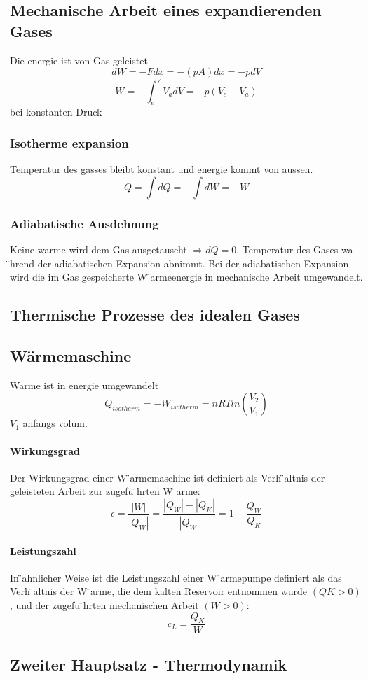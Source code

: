 \documentclass[7pt]{article}
\begin{document}
\begin{multicols*}{3}
\subsection{Mechanische Arbeit eines expandierenden Gases}
Die energie ist von Gas geleistet
\begin{equation}
	dW=-Fdx=-(pA)dx=-pdV
\end{equation}
\begin{equation}
	W=-\int^V_eV_adV=-p(V_e-V_a)
\end{equation}
bei konstanten Druck
\subsubsection{Isotherme expansion}
Temperatur des gasses bleibt konstant und energie kommt von aussen.
\begin{equation}
	Q=\int dQ=-\int dW=-W
\end{equation}
\subsubsection{Adiabatische Ausdehnung}
Keine warme wird dem Gas ausgetauscht $\Rightarrow dQ=0$, Temperatur des Gases wa ̈hrend der adiabatischen Expansion abnimmt. Bei der adiabatischen Expansion wird die im Gas gespeicherte W ̈armeenergie in mechanische Arbeit umgewandelt.

\subsection{Thermische Prozesse des idealen Gases}

\subsection{W{\"a}rmemaschine}
Warme ist in energie umgewandelt
\begin{equation}
	Q_{isotherm}=-W_{isotherm}=nRTln(\frac{V_2}{V_1})
\end{equation}
$V_1$ anfangs volum.
\paragraph{Wirkungsgrad}
Der Wirkungsgrad einer W ̈armemaschine ist definiert als Verh ̈altnis der geleisteten Arbeit zur zugefu ̈hrten W ̈arme:
\begin{equation}
	\epsilon=\frac{|W|}{|Q_W|}=\frac{|Q_W|-|Q_K|}{|Q_W|}=1-\frac{Q_W}{Q_K}
\end{equation}
\paragraph{Leistungszahl}
In  ̈ahnlicher Weise ist die Leistungszahl einer W ̈armepumpe definiert als das Verh ̈altnis der W ̈arme, die dem kalten Reservoir entnommen wurde $(QK > 0)$, und der zugefu ̈hrten mechanischen Arbeit $(W > 0)$:
\begin{equation}
	c_L=\frac{Q_K}{W}
\end{equation}

\subsection{Zweiter Hauptsatz - Thermodynamik}


\end{multicols*}
\end{document}
